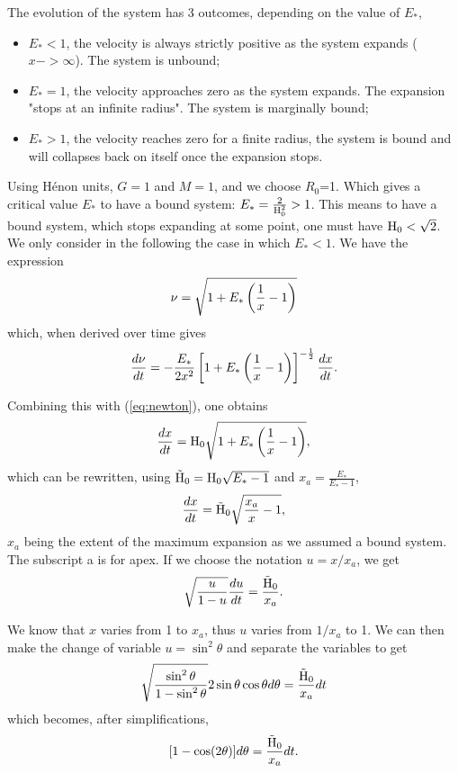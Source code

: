 The evolution of the system has 3 outcomes, depending on the value of $E_\ast$,
\begin{itemize}
\item $E_\ast<1$, the velocity is always strictly positive as the system expands ($x->\infty$). The system is unbound;
\item $E_\ast=1$, the velocity approaches zero as the system expands. The expansion "stops at an infinite radius". The system is marginally bound;
\item $E_\ast>1$, the velocity reaches zero for a finite radius, the system is bound and will collapses back on itself once the expansion stops. 
\end{itemize}

Using H\'enon units, $G=1$ and $M=1$, and we choose $R_0$=1. Which gives a critical value $E_*$ to have a bound system: $E_* = \frac{2}{{\textrm{H}}^2_0} > 1$. This means to have a bound system, which stops expanding at some point, one must have ${\textrm{H}}_0 < \sqrt{2}$.
We only consider in the following the case in which $E_\ast<1$. We have the expression
\begin{equation}
\nu = \sqrt{1+E_\ast\left(\frac{1}{x} - 1\right)}
\end{equation}
which, when derived over time gives
\begin{equation}
\frac{d \nu}{dt} = - \frac{E_\ast}{2 x^2} \left[ 1 + E_\ast\left(\frac{1}{x} -1\right)\right]^{-\frac{1}{2}} \frac{dx}{dt}.
\end{equation}

Combining this with (\ref{eq:newton}), one obtains
\begin{equation}
\frac{dx}{dt} = {\textrm{H}}_0 \sqrt{1+ E_\ast\left( \frac{1}{x} -1\right)},
\end{equation}
which can be rewritten, using $\tilde{{\textrm{H}}}_0 = {\textrm{H}}_0 \sqrt{E_\ast-1}$ and $x_a=\frac{E_\ast}{E_\ast-1}$,
\begin{equation}
\frac{dx}{dt} = \tilde{{\textrm{H}}}_0 \sqrt{\frac{x_a}{x}-1},
\end{equation}
$x_a$ being the extent of the maximum expansion as we assumed a bound system. The subscript a is for apex. If we choose the notation $u = x/x_a$, we get
\begin{equation}
\sqrt{\frac{u}{1-u}} \frac{du}{dt} = \frac{\tilde{{\textrm{H}}}_0}{x_a}.
\end{equation}

We know that $x$ varies from 1 to $x_a$, thus $u$ varies from $1/x_a$ to 1. We can then make the change of variable $u = \sin^2\theta$ and separate the variables to get
\begin{equation}
\sqrt{\frac{\sin^2\theta}{1-\sin^2\theta}} 2 \sin\theta \cos\theta d \theta = \frac{\tilde{{\textrm{H}}}_0}{x_a} dt
\end{equation}
which becomes, after simplifications,
\begin{equation}
\label{Eq:1_integrand_theta}
[ 1 - \cos(2\theta)]d\theta = \frac{\tilde{{\textrm{H}}}_0}{x_a} dt .
\end{equation}


